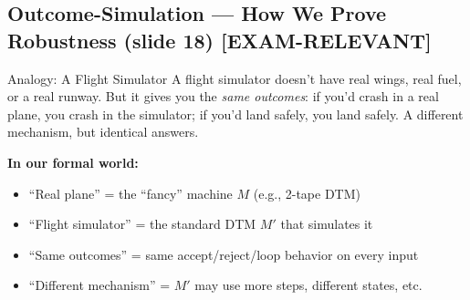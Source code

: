 \documentclass[11pt,a4paper]{article}
\newcommand{\kemark}{\textcolor{red!70!black}{\textbf{[EXAM-RELEVANT]}}}
\begin{document}
\subsection{Outcome-Simulation --- How We Prove Robustness (slide 18) \kemark}

\begin{notebox}{Analogy: A Flight Simulator}
A flight simulator doesn't have real wings, real fuel, or a real runway. But it gives you the \textit{same outcomes}: if you'd crash in a real plane, you crash in the simulator; if you'd land safely, you land safely. A different mechanism, but identical answers.

\textbf{In our formal world:}
\begin{itemize}[nosep]
\item ``Real plane'' = the ``fancy'' machine $M$ (e.g., 2-tape DTM)
\item ``Flight simulator'' = the standard DTM $M'$ that simulates it
\item ``Same outcomes'' = same accept/reject/loop behavior on every input
\item ``Different mechanism'' = $M'$ may use more steps, different states, etc.
\end{itemize}
\end{notebox}
\end{document}
